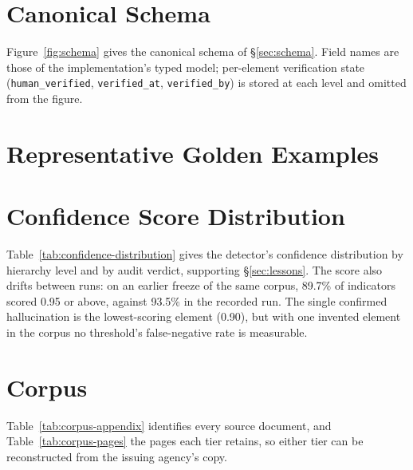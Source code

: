 \documentclass[letterpaper]{article} %
\begin{document}
\section{Canonical Schema}
\label{sec:appendix-schema}

Figure~\ref{fig:schema} gives the canonical schema of \S\ref{sec:schema}.
Field names are those of the implementation's typed model; per-element
verification state (\texttt{human\_verified}, \texttt{verified\_at},
\texttt{verified\_by}) is stored at each level and omitted from the figure.



\section{Representative Golden Examples}
\label{sec:appendix-goldens}


\section{Confidence Score Distribution}
\label{sec:appendix-confidence}

Table~\ref{tab:confidence-distribution} gives the detector's confidence
distribution by hierarchy level and by audit verdict, supporting
\S\ref{sec:lessons}. The score also drifts between runs: on an earlier freeze
of the same corpus, 89.7\% of indicators scored 0.95 or above, against 93.5\%
in the recorded run. The single confirmed hallucination is the lowest-scoring
element (0.90), but with one invented element in the corpus no threshold's
false-negative rate is measurable.



\section{Corpus}
\label{sec:appendix-corpus}

Table~\ref{tab:corpus-appendix} identifies every source document, and
Table~\ref{tab:corpus-pages} the pages each tier retains, so either tier can be
reconstructed from the issuing agency's copy.



\end{document}
